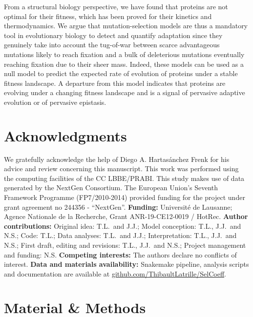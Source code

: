 \documentclass{article}
\begin{document}
    From a structural biology perspective, we have found that proteins are not optimal for their fitness, which has been proved for their kinetics and thermodynamics\cite{taverna_why_2002, goldstein_evolution_2011}.
    We argue that mutation-selection models are thus a mandatory tool in evolutionary biology to detect and quantify adaptation since they genuinely take into account the tug-of-war between scarce advantageous mutations likely to reach fixation and a bulk of deleterious mutations eventually reaching fixation due to their sheer mass.
    Indeed, these models can be used as a null model to predict the expected rate of evolution of proteins\cite{spielman_relationship_2015, dosreis_how_2015} under a stable fitness landscape.
    A departure from this model indicates that proteins are evolving under a changing fitness landscape\cite{rodrigue_detecting_2017, tamuri_mutationselection_2021} and is a signal of pervasive adaptive evolution\cite{rodrigue_bayesian_2021} or of pervasive epistasis\cite{rodrigue_detecting_2017}.


    \section*{Acknowledgments}
    \label{sec:acknowledgment}
    We gratefully acknowledge the help of Diego A. Hartasánchez Frenk for his advice and review concerning this manuscript.
    This work was performed using the computing facilities of the CC LBBE/PRABI\@.
    This study makes use of data generated by the NextGen Consortium.
    The European Union’s Seventh Framework Programme (FP7/2010-2014) provided funding for the project under grant agreement no 244356 - “NextGen”.
    \textbf{Funding:}
    Université de Lausanne; Agence Nationale de la Recherche, Grant ANR-19-CE12-0019 / HotRec.
    \textbf{Author contributions:}
    Original idea: T.L.\ and J.J.;
    Model conception: T.L., J.J.\ and N.S.;
    Code: T.L.;
    Data analyses: T.L.\ and J.J.;
    Interpretation: T.L., J.J.\ and N.S.;
    First draft, editing and revisions: T.L., J.J.\ and N.S.;
    Project management and funding: N.S\@.
    \textbf{Competing interests:}
    The authors declare no conflicts of interest.
    \textbf{Data and materials availability:}
    Snakemake pipeline, analysis scripts and documentation are available at \href{https://github.com/ThibaultLatrille/SelCoeff}{github.com/ThibaultLatrille/SelCoeff}.


    \section{Material \& Methods}
    \label{sec:methods}
\end{document}

